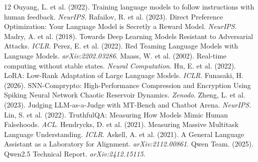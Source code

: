 \documentclass[11pt,a4paper]{article}
\begin{document}
\begin{thebibliography}{12}
 Ouyang, L. et al. (2022). Training language models to follow instructions with human feedback. \textit{NeurIPS}.
 Rafailov, R. et al. (2023). Direct Preference Optimization: Your Language Model is Secretly a Reward Model. \textit{NeurIPS}.
 Madry, A. et al. (2018). Towards Deep Learning Models Resistant to Adversarial Attacks. \textit{ICLR}.
 Perez, E. et al. (2022). Red Teaming Language Models with Language Models. \textit{arXiv:2202.03286}.
 Maass, W. et al. (2002). Real-time computing without stable states. \textit{Neural Computation}.
 Hu, E. et al. (2022). LoRA: Low-Rank Adaptation of Large Language Models. \textit{ICLR}.
 Funasaki, H. (2026). SNN-Comprypto: High-Performance Compression and Encryption Using Spiking Neural Network Chaotic Reservoir Dynamics. \textit{Zenodo}.
 Zheng, L. et al. (2023). Judging LLM-as-a-Judge with MT-Bench and Chatbot Arena. \textit{NeurIPS}.
 Lin, S. et al. (2022). TruthfulQA: Measuring How Models Mimic Human Falsehoods. \textit{ACL}.
 Hendrycks, D. et al. (2021). Measuring Massive Multitask Language Understanding. \textit{ICLR}.
 Askell, A. et al. (2021). A General Language Assistant as a Laboratory for Alignment. \textit{arXiv:2112.00861}.
 Qwen Team. (2025). Qwen2.5 Technical Report. \textit{arXiv:2412.15115}.
\end{thebibliography}
\end{document}

